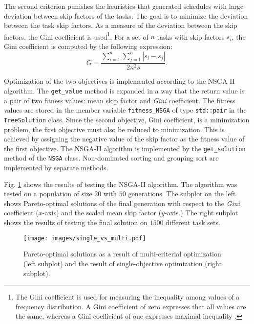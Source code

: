 The second criterion punishes the heuristics that generated schedules with large deviation between skip factors of the tasks.
The goal is to minimize the deviation between the task skip factors.
As a measure of the deviation between the skip factors, the Gini coefficient is used\footnote{The Gini coefficient is used for measuring the inequality among values of a frequency distribution. A Gini coefficient of zero expresses that all values are the same, whereas a Gini coefficient of one expresses maximal inequality \cite{gini1912variabilita}.}.
For a set of $n$ tasks with skip factors $s_i$, the Gini coefficient is computed by the following expression:
\begin{equation*}
G = \frac{\sum_{i=1}^{n}\sum_{j=1}^{n}|s_i - s_j|}{2n^2\overline{s}}.
\end{equation*}

Optimization of the two objectives is implemented according to the NSGA-II algorithm.
The \texttt{get\_value} method is expanded in a way that the return value is a pair of two fitness values: mean skip factor and \textit{Gini} coefficient.
The fitness values are stored in the member variable \texttt{fitness\_NSGA} of type \texttt{std::pair} in the \texttt{TreeSolution} class.
Since the second objective, Gini coefficient, is a minimization problem, the first objective must also be reduced to minimization.
This is achieved by assigning the negative value of the skip factor as the fitness value of the first objective.
The NSGA-II algorithm is implemented by the \texttt{get\_solution} method of the \texttt{NSGA} class.
Non-dominated sorting and grouping sort are implemented by separate methods.

Fig. \ref{single_vs_multi} shows the results of testing the NSGA-II algorithm.
The algorithm was tested on a population of size $20$ with $50$ generations.
The subplot on the left shows Pareto-optimal solutions of the final generation with respect to the \textit{Gini} coefficient ($x$-axis) and the scaled mean skip factor ($y$-axis.)
The right subplot shows the results of testing the final solution on $1500$ different task sets.
\begin{figure}[ht]
    \centering
    \texttt{[image: images/single\_vs\_multi.pdf]}
    \caption{Pareto-optimal solutions as a result of multi-criterial optimization (left subplot) and the result of single-objective optimization (right subplot). }
    \label{single_vs_multi}
\end{figure}

